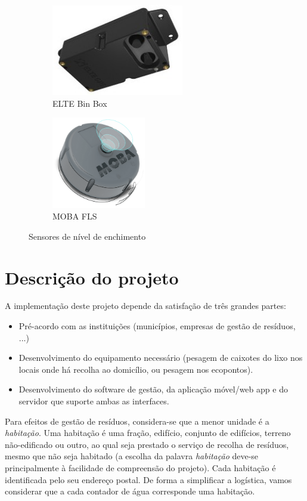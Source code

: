 \documentclass[11pt, a4paper, oneside]{book}
\begin{document}
\begin{figure}[ht]
  \centering
  \begin{subfigure}[b]{0.52\textwidth}
    \centering
    \includegraphics[height = 40mm]{img/elte-fls.jpg}
    \caption{ELTE Bin Box \cite{elte-fls}}
  \end{subfigure}
  \begin{subfigure}[b]{0.47\textwidth}
    \centering
    \includegraphics[height = 40mm]{img/moba-fls.png}
    \caption{MOBA FLS \cite{moba-fls}}
  \end{subfigure}
  \caption{Sensores de nível de enchimento}
\end{figure}

\chapter{Descrição do projeto}
\label{ch:descricao}

A implementação deste projeto depende da satisfação de três grandes partes:

\begin{itemize}
    \itemsep0em
    \item Pré-acordo com as instituições (municípios, empresas de gestão de resíduos, ...)
    \item Desenvolvimento do equipamento necessário (pesagem de caixotes do lixo nos locais  onde há recolha ao domicílio, ou pesagem nos ecopontos).
    \item Desenvolvimento do software de gestão, da aplicação móvel/web app e do servidor que suporte ambas as interfaces.
\end{itemize}

Para efeitos de gestão de resíduos, considera-se que a menor unidade é a \textit{habitação}. Uma habitação é uma fração, edifício, conjunto de edifícios, terreno não-edificado ou outro, ao qual seja prestado o serviço de recolha de resíduos, mesmo que não seja habitado (a escolha da palavra \textit{habitação} deve-se principalmente à facilidade de compreensão do projeto). Cada habitação é identificada pelo seu endereço postal. De forma a simplificar a logística, vamos considerar que a cada contador de água corresponde uma habitação.
\end{document}
